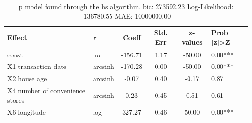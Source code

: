 \begin{table}
	\caption{p model found through the hs algorithm. bic: 273592.23 Log-Likelihood: -136780.55 MAE: 10000000.00}
	\begin{center}
		\begin{tabular}{|l|l|c|c|c|l|}
			\hline
			Effect & $\tau$ & Coeff & Std. Err & z-values & Prob |z|>Z \\
			\hline
			const & no & -156.71 & 1.17 & -50.00 & 0.00*** \\
			\hline
			X1 transaction date & arcsinh & -170.28 & 0.00 & -50.00 & 0.00*** \\
			\hline
			X2 house age & arcsinh & -0.07 & 0.40 & -0.17 & 0.87 \\
			\hline
			X4 number of convenience stores & arcsinh & 0.23 & 0.45 & 0.51 & 0.61 \\
			\hline
			X6 longitude & log & 327.27 & 0.46 & 50.00 & 0.00*** \\
			\hline
		\end{tabular}
	\end{center}
\end{table}